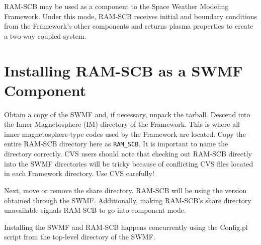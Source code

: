 RAM-SCB may be used as a component to the Space Weather Modeling Framework.
Under this mode, RAM-SCB receives initial and boundary conditions from the
Framework's other components and returns plasma properties to create a two-way
coupled system.


\section{Installing RAM-SCB as a SWMF Component}

Obtain a copy of the SWMF and, if necessary, unpack the tarball.  Descend into
the Inner Magnetosphere (IM) directory of the Framework.  This is where all
inner magnetosphere-type codes used by the Framework are located.  Copy the
entire RAM-SCB directory here as {\tt RAM\_SCB}.  It is important to name the
directory correctly. CVS users should note that checking out RAM-SCB directly into the SWMF directories will be
tricky because of conflicting CVS files located in each Framework directory. Use CVS carefully! 

Next, move or remove the share directory. RAM-SCB will be using the version obtained through the
SWMF. Additionally, making RAM-SCB's share directory unavailable signals RAM-SCB to go into component mode.

Installing the SWMF and RAM-SCB happens concurrently using the Config.pl
script from the top-level directory of the SWMF.  

